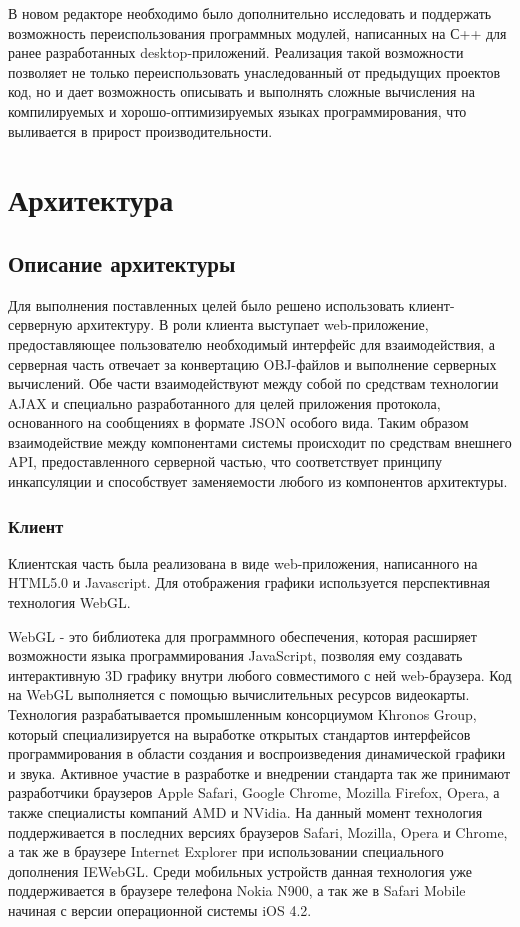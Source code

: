 \documentclass[12pt, a4paper]{article}
\let\stdsection\section
\renewcommand\section{\newpage\stdsection}
\begin{document}
В новом редакторе необходимо было дополнительно исследовать и поддержать
возможность переиспользования программных модулей, написанных на С++ для ранее
разработанных desktop-приложений.  Реализация такой возможности позволяет не
только переиспользовать унаследованный от предыдущих проектов код, но и дает
возможность описывать и выполнять сложные вычисления на компилируемых и
хорошо-оптимизируемых языках программирования, что выливается в прирост
производительности.

\section{Архитектура}

\subsection{Описание архитектуры}

Для выполнения поставленных целей было решено использовать клиент-серверную
архитектуру. В роли клиента выступает web-приложение, предоставляющее
пользователю необходимый интерфейс для взаимодействия, а серверная часть
отвечает за конвертацию OBJ-файлов и выполнение серверных вычислений. Обе части
взаимодействуют между собой по средствам технологии AJAX и специально
разработанного для целей приложения протокола, основанного на сообщениях в
формате JSON особого вида. Таким образом взаимодействие между компонентами системы
происходит по средствам внешнего API, предоставленного серверной частью,
что соответствует принципу инкапсуляции и способствует заменяемости
любого из компонентов архитектуры.

\subsubsection{Клиент}

Клиентская часть была реализована в виде web-приложения, написанного
на HTML5.0 и Javascript. Для отображения графики используется
перспективная технология WebGL.

WebGL - это библиотека для программного обеспечения, которая расширяет
возможности языка программирования JavaScript, позволяя ему создавать
интерактивную 3D графику внутри любого совместимого с ней web-браузера. Код на
WebGL выполняется с помощью вычислительных ресурсов видеокарты. Технология
разрабатывается промышленным консорциумом Khronos Group, который
специализируется на выработке открытых стандартов интерфейсов программирования в
области создания и воспроизведения динамической графики и звука. Активное
участие в разработке и внедрении стандарта так же принимают разработчики
браузеров Apple Safari, Google Chrome, Mozilla Firefox, Opera,  а также
специалисты компаний AMD и NVidia. На данный момент технология поддерживается в
последних версиях браузеров Safari, Mozilla, Opera и Chrome, а так же в браузере
Internet Explorer при использовании специального дополнения IEWebGL. Среди
мобильных устройств данная технология уже поддерживается в браузере телефона
Nokia N900, а так же в Safari Mobile начиная с версии операционной системы iOS
4.2.
\end{document}
